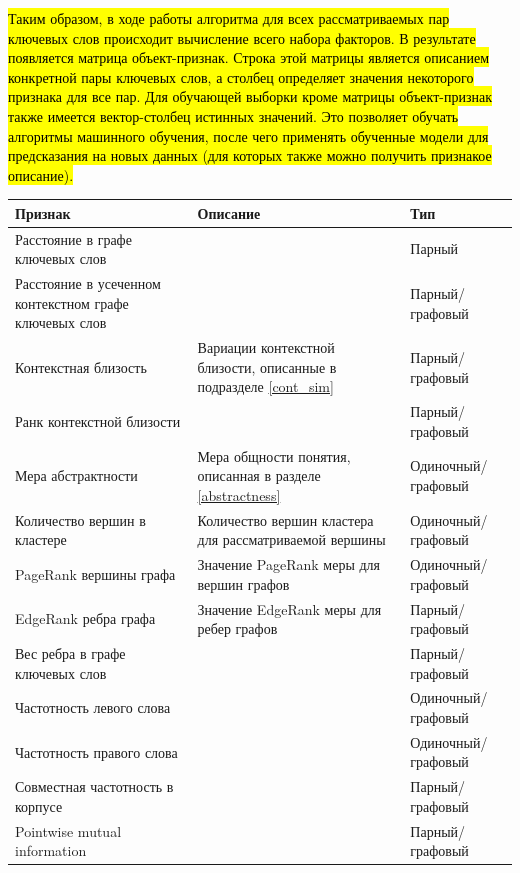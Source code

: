 \hl{Таким образом, в ходе работы алгоритма для всех рассматриваемых пар ключевых слов происходит вычисление всего набора факторов. В результате появляется матрица объект-признак. Строка этой матрицы является описанием конкретной пары ключевых слов, а столбец определяет значения некоторого признака для все пар. Для обучающей выборки кроме матрицы объект-признак также имеется вектор-столбец истинных значений. Это позволяет обучать алгоритмы машинного обучения, после чего применять обученные модели для предсказания на новых данных (для которых также можно получить признакое описание). }



\begin{longtable}{|p{5cm}|p{4cm}|p{5cm}|}
        \hline
        Признак & Описание & Тип \\ \hline
        Расстояние в графе ключевых слов & & Парный \\ \hline
        Расстояние в усеченном контекстном графе ключевых слов & & Парный/графовый \\ \hline
        Контекстная близость & Вариации контекстной близости, описанные в подразделе \ref{cont_sim} & Парный/графовый \\ \hline
        Ранк контекстной близости & & Парный/графовый \\ \hline
        Мера абстрактности & Мера общности понятия, описанная в разделе \ref{abstractness} & Одиночный/графовый \\ \hline
        Количество вершин в кластере & Количество вершин кластера для рассматриваемой вершины & Одиночный/графовый \\ \hline
        PageRank вершины графа & Значение PageRank меры для вершин графов & Одиночный/графовый \\ \hline
        EdgeRank ребра графа & Значение EdgeRank меры для ребер графов & Парный/графовый \\ \hline
        Вес ребра в графе ключевых слов & & Парный/графовый \\ \hline
        Частотность левого слова & & Одиночный/графовый \\ \hline
        Частотность правого слова & & Одиночный/графовый \\ \hline
        Совместная частотность в корпусе & & Парный/графовый \\ \hline
        Pointwise mutual information & & Парный/графовый \\ \hline

\end{longtable}
